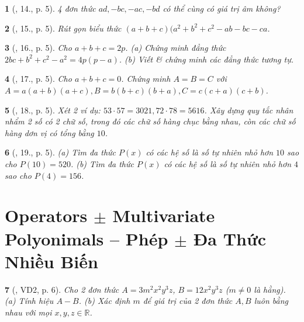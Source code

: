 \documentclass{article}
\newtheorem{baitoan}{}
\begin{document}
\begin{baitoan}[\cite{Binh_Toan_8_tap_1}, 14., p. 5]
	4 đơn thức $ad,-bc,-ac,-bd$ có thể cùng có giá trị âm không?
\end{baitoan}

\begin{baitoan}[\cite{Binh_Toan_8_tap_1}, 15., p. 5]
	Rút gọn biểu thức $(a + b + c)(a^2 + b^2 + c^2 - ab - bc - ca$.
\end{baitoan}

\begin{baitoan}[\cite{Binh_Toan_8_tap_1}, 16., p. 5]
	Cho $a + b + c = 2p$. (a) Chứng minh đẳng thức $2bc + b^2 + c^2 - a^2 = 4p(p - a)$. (b) Viết \& chứng minh các đẳng thức tương tự.
\end{baitoan}

\begin{baitoan}[\cite{Binh_Toan_8_tap_1}, 17., p. 5]
	Cho $a + b + c = 0$. Chứng minh $A = B = C$ với $A = a(a + b)(a + c),B = b(b + c)(b + a),C = c(c + a)(c + b)$.
\end{baitoan}

\begin{baitoan}[\cite{Binh_Toan_8_tap_1}, 18., p. 5]
	Xét 2 ví dụ: $53\cdot57 = 3021,72\cdot78 = 5616$. Xây dựng quy tắc nhân nhẩm 2 số có 2 chữ số, trong đó các chữ số hàng chục bằng nhau, còn các chữ số hàng dơn vị có tổng bằng $10$.
\end{baitoan}

\begin{baitoan}[\cite{Binh_Toan_8_tap_1}, 19., p. 5]
	(a) Tìm đa thức $P(x)$ có các hệ số là số tự nhiên nhỏ hơn $10$ sao cho $P(10) = 520$. (b) Tìm đa thức $P(x)$ có các hệ số là số tự nhiên nhỏ hơn $4$ sao cho $P(4) = 156$.
\end{baitoan}


\section{Operators $\pm$ Multivariate Polyonimals -- Phép $\pm$ Đa Thức Nhiều Biến}

\begin{baitoan}[\cite{Tuyen_Toan_8}, VD2, p. 6]
	Cho 2 đơn thức $A = 3m^2x^2y^3z$, $B = 12x^2y^3z$ ($m\ne0$ là hằng). (a) Tính hiệu $A - B$. (b) Xác định $m$ để giá trị của 2 đơn thức $A,B$ luôn bằng nhau với mọi $x,y,z\in\mathbb{R}$.
\end{baitoan}
\end{document}
